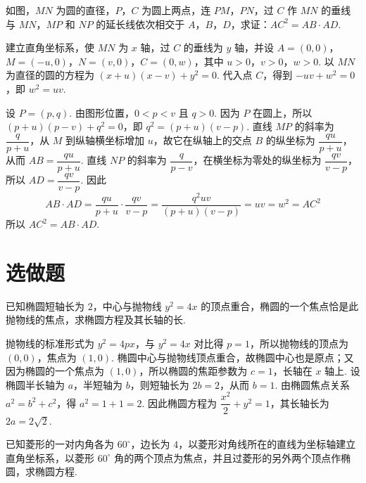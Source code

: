 \begin{problem}
如图，\(MN\) 为圆的直径，\(P\)，\(C\) 为圆上两点，连 \(PM\)，\(PN\)，过 \(C\) 作 \(MN\) 的垂线与 \(MN\)，\(MP\) 和 \(NP\) 的延长线依次相交于 \(A\)，\(B\)，\(D\)，求证：\(AC^2=AB\cdot AD\).

\end{problem}

\begin{solution}
建立直角坐标系，使 \(MN\) 为 \(x\) 轴，过 \(C\) 的垂线为 \(y\) 轴，并设 \(A=(0,0)\)，\(M=(-u,0)\)，\(N=(v,0)\)，\(C=(0,w)\)，其中 \(u>0\)，\(v>0\)，\(w>0\). 以 \(MN\) 为直径的圆的方程为 \(\left(x+u\right)\left(x-v\right)+y^2=0\). 代入点 \(C\)，得到 \(-uv+w^2=0\)，即 \(w^2=uv\).

设 \(P=(p,q)\). 由图形位置，\(0<p<v\) 且 \(q>0\). 因为 \(P\) 在圆上，所以 \(\left(p+u\right)\left(p-v\right)+q^2=0\)，即 \(q^2=\left(p+u\right)\left(v-p\right)\). 直线 \(MP\) 的斜率为 \(\dfrac{q}{p+u}\)，从 \(M\) 到纵轴横坐标增加 \(u\)，故它在纵轴上的交点 \(B\) 的纵坐标为 \(\dfrac{qu}{p+u}\)，从而 \(AB=\dfrac{qu}{p+u}\). 直线 \(NP\) 的斜率为 \(\dfrac{q}{p-v}\)，在横坐标为零处的纵坐标为 \(\dfrac{qv}{v-p}\)，所以 \(AD=\dfrac{qv}{v-p}\). 因此
\[
AB\cdot AD=\frac{qu}{p+u}\cdot\frac{qv}{v-p}=\frac{q^2uv}{\left(p+u\right)\left(v-p\right)}=uv=w^2=AC^2
\]
所以 \(AC^2=AB\cdot AD\).
\end{solution}

\section{选做题}

\begin{problem}[甲]
已知椭圆短轴长为 \(2\)，中心与抛物线 \(y^2=4x\) 的顶点重合，椭圆的一个焦点恰是此抛物线的焦点，求椭圆方程及其长轴的长.
\end{problem}

\begin{solution}
抛物线的标准形式为 \(y^2=4px\)，与 \(y^2=4x\) 对比得 \(p=1\)，所以抛物线的顶点为 \((0,0)\)，焦点为 \((1,0)\). 椭圆中心与抛物线顶点重合，故椭圆中心也是原点；又因为椭圆的一个焦点为 \((1,0)\)，所以椭圆的焦距参数为 \(c=1\)，长轴在 \(x\) 轴上. 设椭圆半长轴为 \(a\)，半短轴为 \(b\)，则短轴长为 \(2b=2\)，从而 \(b=1\). 由椭圆焦点关系 \(a^2=b^2+c^2\)，得 \(a^2=1+1=2\). 因此椭圆方程为 \(\dfrac{x^2}{2}+y^2=1\)，其长轴长为 \(2a=2\sqrt{2}\).
\end{solution}

\reuseproblemnumber
\begin{problem}[乙]
已知菱形的一对内角各为 \(60^\circ\)，边长为 \(4\)，以菱形对角线所在的直线为坐标轴建立直角坐标系，以菱形 \(60^\circ\) 角的两个顶点为焦点，并且过菱形的另外两个顶点作椭圆，求椭圆方程.
\end{problem}

